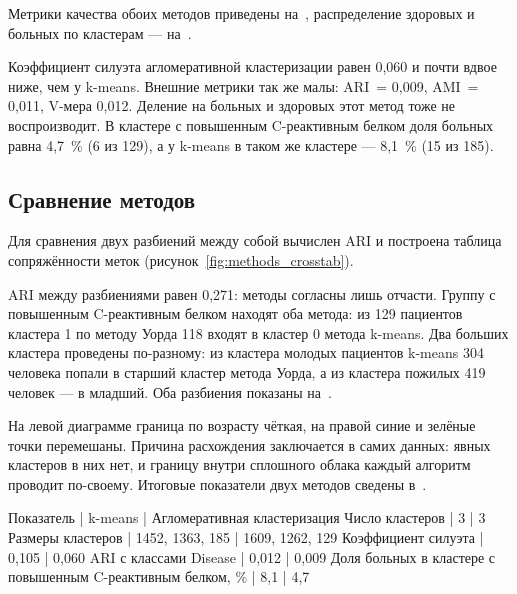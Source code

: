 \documentclass[a4paper,14pt]{extarticle}
\begin{document}
Метрики качества обоих методов приведены на~, распределение здоровых и больных по кластерам — на~.



Коэффициент силуэта агломеративной кластеризации равен 0,060 и почти вдвое ниже, чем у k-means. Внешние метрики так же малы: ARI~= 0,009, AMI~= 0,011, V-мера 0,012. Деление на больных и здоровых этот метод тоже не воспроизводит. В кластере с повышенным C-реактивным белком доля больных равна 4,7~\% (6 из 129), а у k-means в таком же кластере — 8,1~\% (15 из 185).

\subsection{Сравнение методов}

Для сравнения двух разбиений между собой вычислен ARI и построена таблица сопряжённости меток (рисунок~\ref{fig:methods_crosstab}).


ARI между разбиениями равен 0,271: методы согласны лишь отчасти. Группу с повышенным C-реактивным белком находят оба метода: из 129 пациентов кластера 1 по методу Уорда 118 входят в кластер 0 метода k-means. Два больших кластера проведены по-разному: из кластера молодых пациентов k-means 304 человека попали в старший кластер метода Уорда, а из кластера пожилых 419 человек — в младший. Оба разбиения показаны на~.


На левой диаграмме граница по возрасту чёткая, на правой синие и зелёные точки перемешаны. Причина расхождения заключается в самих данных: явных кластеров в них нет, и границу внутри сплошного облака каждый алгоритм проводит по-своему. Итоговые показатели двух методов сведены в~.

Показатель | k-means | Агломеративная кластеризация
Число кластеров | 3 | 3
Размеры кластеров | 1452, 1363, 185 | 1609, 1262, 129
Коэффициент силуэта | 0,105 | 0,060
ARI с классами Disease | 0,012 | 0,009
Доля больных в кластере с повышенным C-реактивным белком, \% | 8,1 | 4,7
\end{document}
